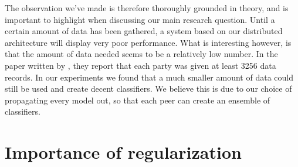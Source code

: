 The observation we've made is therefore thoroughly grounded in theory, and is important to highlight when discussing our main research question. Until a certain amount of data has been gathered, a system based on our distributed architecture will display very poor performance. What is interesting however, is that the amount of data needed seems to be a relatively low number. In the paper written by \cite{pathak2010diffprivhomo}, they report that each party was given at least 3256 data records. In our experiments we found that a much smaller amount of data could still be used and create decent classifiers. We believe this is due to our choice of propagating every model out, so that each peer can create an ensemble of classifiers. 

\section{Importance of regularization}

